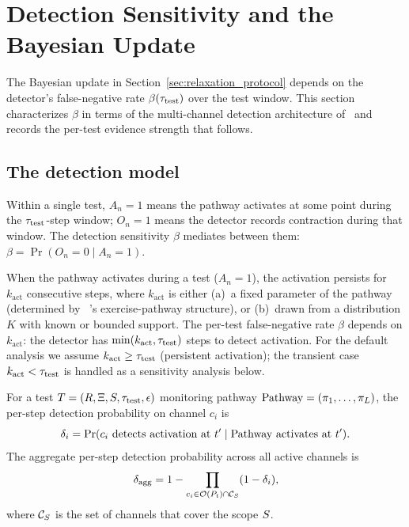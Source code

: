 \section{Detection Sensitivity and the Bayesian Update}
\label{sec:detection_sensitivity}

The Bayesian update in Section~\ref{sec:relaxation_protocol}
depends on the detector's false-negative rate $\beta(\tau_{\mathrm{test}})$
over the test window.  This section characterizes $\beta$ in
terms of the multi-channel detection architecture
of~\citep[Table~1]{lasser2026scm} and records the per-test
evidence strength that follows.

\subsection{The detection model}

Within a single test, $A_n = 1$ means the pathway activates at
some point during the $\tau_{\mathrm{test}}$-step window; $O_n = 1$ means the
detector records contraction during that window.  The detection
sensitivity $\beta$ mediates between them:
$\beta = \Pr(O_n = 0 \mid A_n = 1)$.

\begin{assumption}
\label{ass:D0}
When the pathway activates during a test ($A_n = 1$), the
activation persists for $k_{\mathrm{act}}$ consecutive steps,
where $k_{\mathrm{act}}$ is either (a)~a fixed parameter of the
pathway (determined by
~\citep[Definition~2]{lasser2026horizon}'s exercise-pathway
structure), or (b)~drawn from a distribution $K$ with known or
bounded support.  The per-test false-negative rate $\beta$
depends on $k_{\mathrm{act}}$: the detector has
$\min(k_{\mathrm{act}}, \tau_{\mathrm{test}})$ steps to detect activation.
For the default analysis we assume
$k_{\mathrm{act}} \geq \tau_{\mathrm{test}}$ (persistent activation); the
transient case $k_{\mathrm{act}} < \tau_{\mathrm{test}}$ is handled as a
sensitivity analysis below.
\end{assumption}

\begin{definition}
\label{def:detection_sensitivity}
For a test $T = (R, \Xi, S, \tau_{\mathrm{test}}, \epsilon)$
monitoring pathway $\mathrm{Pathway} = (\pi_1, \ldots, \pi_L)$, the
per-step detection probability on channel $c_i$ is
$$
\delta_i
   = \Pr(c_i \text{ detects activation at } t'
         \mid \mathrm{Pathway} \text{ activates at } t').
$$
The aggregate per-step detection probability across all active
channels is
\begin{equation}
\label{eq:delta_agg}
\delta_{\mathrm{agg}} = 1 - \prod_{c_i \in \mathcal{O}(P_t) \cap \mathcal{C}_{S}}
  (1 - \delta_i),
\end{equation}
where $\mathcal{C}_{S}$ is the set of channels that cover
the scope $S$.
\end{definition}

